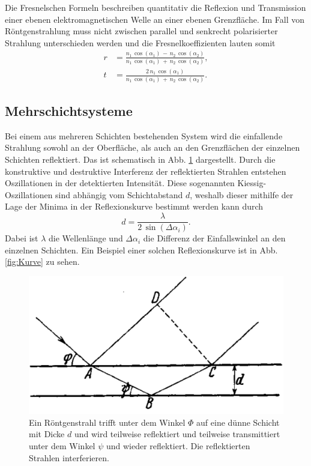 Die Fresnelschen Formeln beschreiben quantitativ die Reflexion und Transmission einer ebenen elektromagnetischen Welle an einer ebenen Grenzfläche. %
Im Fall von Röntgenstrahlung muss nicht zwischen parallel und senkrecht polarisierter Strahlung unterschieden werden und die Fresnelkoeffizienten lauten somit
\begin{align*}
    r &= \frac{n_1 \, \cos(\alpha_1) \, - \, n_2 \, \cos(\alpha_2)}{n_1 \, \cos(\alpha_1) \, + \, n_2 \, \cos(\alpha_2)}, \\
    t &= \frac{2 \, n_1 \, \cos(\alpha_1)}{n_1 \, \cos(\alpha_1) \, + \, n_2 \, \cos(\alpha_2)}.
\end{align*}


\subsection{Mehrschichtsysteme}
Bei einem aus mehreren Schichten bestehenden System wird die einfallende Strahlung sowohl an der Oberfläche, als auch an den Grenzflächen der einzelnen Schichten reflektiert. Das ist schematisch in Abb. \ref{fig:Kiessig} dargestellt.
Durch die konstruktive und destruktive Interferenz der reflektierten Strahlen entstehen Oszillationen in der detektierten Intensität. Diese sogenannten Kiessig-Oszillationen sind abhängig vom Schichtabstand $d$, weshalb dieser mithilfe der Lage der Minima in der Reflexionskurve bestimmt werden kann durch
\begin{equation}
    d = \frac{\lambda}{2 \, \sin(\Delta \alpha_i)}.
    \label{eq:Schichtdicke}
\end{equation}
Dabei ist $\lambda$ die Wellenlänge und $\Delta \alpha_i$ die Differenz der Einfallswinkel an den einzelnen Schichten.
Ein Beispiel einer solchen Reflexionskurve ist in Abb. \ref{fig:Kurve} zu sehen.

\begin{figure}
    \centering
    \includegraphics[width=0.5\linewidth]{./figures/Kiessig.png}
    \caption{Ein Röntgenstrahl trifft unter dem Winkel $\Phi$ auf eine dünne Schicht mit Dicke $d$ und wird teilweise reflektiert und teilweise transmittiert unter dem Winkel $\psi$ und wieder reflektiert. Die reflektierten Strahlen interferieren. \cite{Kiessig}}
    \label{fig:Kiessig}
\end{figure}

